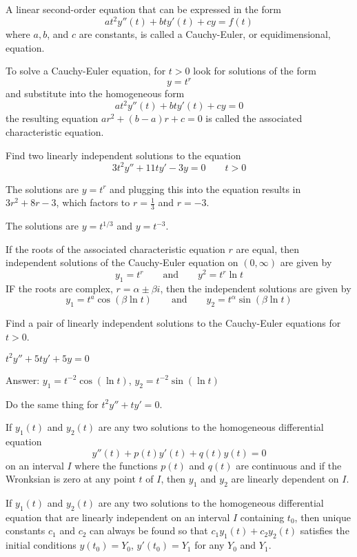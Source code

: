 \documentclass[../diffeq.tex]{subfiles}
\begin{document}
\begin{definition}
    A linear second-order equation that can be expressed in the form 
    \[ at^2y''(t)+bty'(t)+cy=f(t) \]
    where $a,b$, and $c$ are constants, is called a Cauchy-Euler, or equidimensional, equation.
\end{definition}

To solve a Cauchy-Euler equation, for $t>0$ look for solutions of the form 
\[ y=t^r \]
and substitute into the homogeneous form 
\[ at^2y''(t)+bty'(t)+cy =0 \]
the resulting equation $ar^2+(b-a)r+c=0$ is called the associated characteristic equation.

\begin{example}
    Find two linearly independent solutions to the equation 
    \[ 3t^2y''+11ty'-3y=0 \qquad t>0 \]

    The solutions are $y=t^r$ and plugging this into the equation results in $3r^2+8r-3$, which factors to $r=\frac{1}{3}$ and $r=-3$.

    The solutions are $y=t^{1/3}$ and $y=t^{-3}$.
\end{example}

If the roots of the associated characteristic equation $r$ are equal, then independent solutions of the Cauchy-Euler equation on $(0, \infty)$ are given by 
\[ y_1 = t^r \qquad \text{and} \qquad y^2 = t^r\ln t\]
IF the roots are complex, $r=\alpha\pm\beta i$, then the independent solutions are given by 
\[ y_1=t^a\cos(\beta \ln t) \qquad \text{and} \qquad y_2=t^{\alpha}\sin(\beta \ln t) \]

\begin{example}
    Find a pair of linearly independent solutions to the Cauchy-Euler equations for $t>0$.

    $t^2y''+5ty'+5y=0$

    Answer: $y_1=t^{-2}\cos (\ln t)$, $y_2=t^{-2}\sin(\ln t)$
\end{example}

\ex Do the same thing for $t^2y''+ty'=0$.

\begin{lemma}
    If $y_1(t)$ and $y_2(t)$ are any two solutions to the homogeneous differential equation 
    \[ y''(t)+p(t)y'(t)+q(t)y(t) =0 \]
    on an interval $I$ where the functions $p(t)$ and $q(t)$ are continuous and if the Wronksian is zero at any point $t$ of $I$, then $y_1$ and $y_2$ are linearly dependent on $I$.
\end{lemma}

\begin{theorem}
    If $y_1(t)$ and $y_2(t)$ are any two solutions to the homogeneous differential equation that are linearly independent on an interval $I$ containing $t_0$, then unique constants $c_1$ and $c_2$ can always be found so that $c_1y_1(t)+c_2y_2(t)$ satisfies the initial
    conditions $y(t_0)=Y_0$, $y'(t_0)=Y_1$ for any $Y_0$ and $Y_1$.
\end{theorem}
\end{document}
